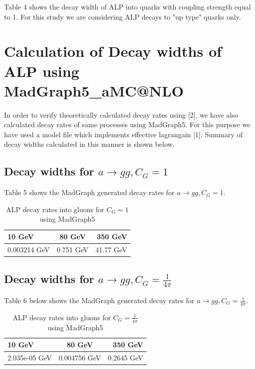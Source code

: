 \documentclass[12pt,a4paper]{article}
\begin{document}
Table 4 shows the decay width of ALP into quarks with coupling strength equal to 1. For this study we are considering ALP decays to "up type" quarks only.

\section{Calculation of Decay widths of ALP using MadGraph5\_aMC@NLO}
In order to verify theoretically calculated decay rates using [2], we have also calculated decay rates of same processes using MadGraph5. For this purpose we have used a model file which implements effective lagrangain [1]. Summary of decay widths calculated in this manner is shown below.
\subsection{Decay widths for $a \rightarrow g g, C_G = 1$}
Table 5 shows the MadGraph generated decay rates for $a \rightarrow g g, C_G = 1$. \\

\begin{table}[!h]
\begin{center}
\label{tab : table5}
\begin{tabular}{l|c|r}
\hline
\textbf{10 GeV} & \textbf{80 GeV} & \textbf{350 GeV} \\
\hline
0.003214 GeV &  0.751 GeV  & 41.77 GeV  \\
\hline
\end{tabular}
\caption{ALP decay rates into gluons for $C_G =1$ using MadGraph5}
\end{center}
\end{table}

\subsection{Decay widths for $a \rightarrow g g, C_G = \frac{1}{4\pi}$}
Table 6 below shows the MadGraph generated decay rates for $a \rightarrow g g, C_G = \frac{1}{4\pi}$. \\

\begin{table}[!h]
\begin{center}
\label{tab : table6}
\begin{tabular}{l|c|r}
\hline
\textbf{10 GeV} & \textbf{80 GeV} & \textbf{350 GeV} \\
\hline
2.035e-05 GeV & 0.004756 GeV  & 0.2645 GeV  \\
\hline
\end{tabular}
\caption{ALP decay rates into gluons for $C_G =\frac{1}{4\pi}$ using MadGraph5}
\end{center}
\end{table}
\end{document}
